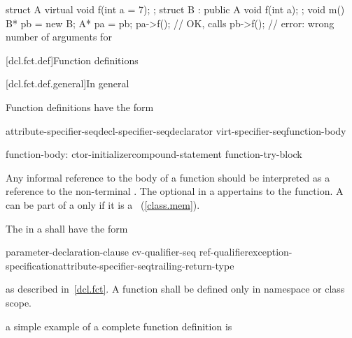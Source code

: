 \begin{codeblock}
struct A {
  virtual void f(int a = 7);
};
struct B : public A {
  void f(int a);
};
void m() {
  B* pb = new B;
  A* pa = pb;
  pa->f();          // OK, calls 
  pb->f();          // error: wrong number of arguments for 
}
\end{codeblock}
\exitexample%
%

[dcl.fct.def]{Function definitions}%

[dcl.fct.def.general]{In general}

\pnum
{}%
Function definitions have the form

%
%
\begin{bnf}
\br
    attribute-specifier-seq\opt decl-specifier-seq\opt declarator virt-specifier-seq\opt function-body
\end{bnf}

\begin{bnf}
function-body:\br
    ctor-initializer\opt compound-statement\br
    function-try-block\br
    \br
\end{bnf}

Any informal reference to the body of a function should be interpreted as a reference to
the non-terminal .
The optional  in a 
appertains to the function.
A  can be part of a 
only if it is a ~(\ref{class.mem}).

\pnum
The
in a
shall have the form

\begin{ncsimplebnf}
 parameter-declaration-clause \terminal{)} cv-qualifier-seq\opt\br   
    \hspace*{\bnfindentinc}ref-qualifier\opt exception-specification\opt attribute-specifier-seq\opt trailing-return-type\opt
\end{ncsimplebnf}

as described in~\ref{dcl.fct}.
A function shall be defined only in namespace or class scope.

\pnum
\enterexample
a simple example of a complete function definition is

